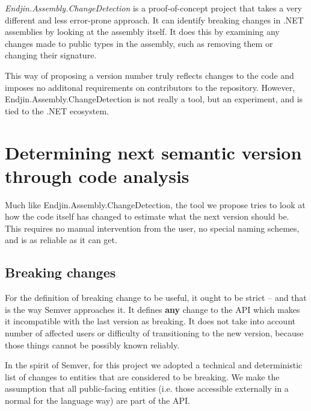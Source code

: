 \documentclass{l4proj}
\begin{document}
\textit{Endjin.Assembly.ChangeDetection}\cite{Endjin} is a
proof-of-concept project that takes a very different and less
error-prone approach. It can identify breaking changes in .NET
assemblies by looking at the assembly itself. It does this
by examining any changes made to public types in the assembly, such as
removing them or changing their signature.

This way of proposing a version number truly reflects changes to
the code and imposes no additonal requirements on contributors to
the repository. However, Endjin.Assembly.ChangeDetection is not really
a tool, but an experiment, and is tied to the .NET ecosystem.

\chapter{Determining next semantic version through code analysis}

Much like Endjin.Assembly.ChangeDetection, the tool we propose tries
to look at how the code itself has changed to estimate what the next
version should be. This requires no manual intervention from the user,
no special naming schemes, and is as reliable as it can get.


\section{Breaking changes}

For the definition of breaking change to be useful, it ought to be
strict -- and that is the way Semver approaches it. It defines
\textbf{any} change to the API which makes it incompatible with the
last version as breaking. It does not take into account number of
affected users or difficulty of transitioning to the new version,
because those things cannot be possibly known reliably.

In the spirit of Semver, for this project we adopted a technical and
deterministic list of changes to entities that are considered
to be breaking. We make the assumption that all public-facing entities
(i.e. those accessible externally in a normal for the language way)
are part of the API.
\end{document}
